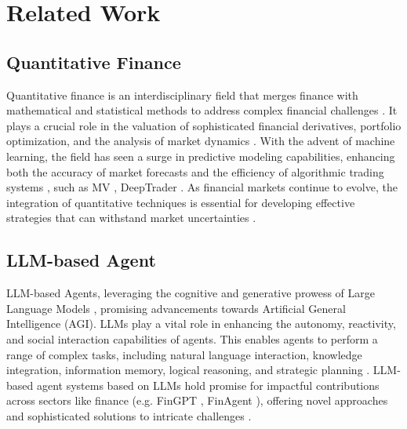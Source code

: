 \section{Related Work}
\subsection{Quantitative Finance}
Quantitative finance is an interdisciplinary field that merges finance with mathematical and statistical methods to address complex financial challenges \cite{kou2019machine,kanamura2021pricing}. It plays a crucial role in the valuation of sophisticated financial derivatives, portfolio optimization, and the analysis of market dynamics \cite{tavella2003quantitative,horvath2021deep}. With the advent of machine learning, the field has seen a surge in predictive modeling capabilities, enhancing both the accuracy of market forecasts and the efficiency of algorithmic trading systems \cite{mieg2022volatility}, such as MV \cite{YU2011367}, DeepTrader \cite{wang2021deeptrader}. As financial markets continue to evolve, the integration of quantitative techniques is essential for developing effective strategies that can withstand market uncertainties \cite{finreportacm}.

\subsection{LLM-based Agent}
LLM-based Agents, leveraging the cognitive and generative prowess of Large Language Models \cite{touvron2023llama, chowdhery2023palm}, promising advancements towards Artificial General Intelligence (AGI)\cite{yang2023autogpt}. LLMs play a vital role in enhancing the autonomy\cite{Wang_2024}, reactivity, and social interaction capabilities of agents. This enables agents to perform a range of complex tasks, including natural language interaction, knowledge integration, information memory, logical reasoning, and strategic planning\cite{sumers2023cognitive, park2023generative} . LLM-based agent systems based on LLMs hold promise for impactful contributions across sectors like finance (e.g. FinGPT \cite{yang2023fingpt}, FinAgent \cite{zhang2024multimodal}), offering novel approaches and sophisticated solutions to intricate challenges \cite{hong2023metagpt,wu2023bloomberggpt,zhang2023appagent}.